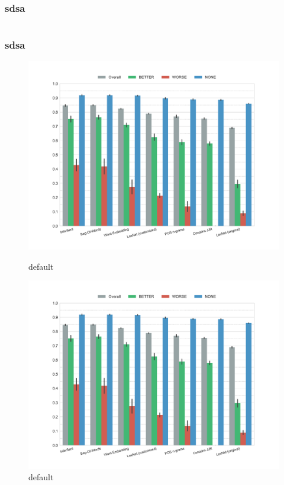\documentclass[11pt,aspectratio=169]{beamer}
\begin{document}
    \begin{frame}
        \frametitle{sdsa}
        \begin{columns}[t]
            \blindtext
            \blindtext
        \end{columns}
    \end{frame}
    \begin{frame}[fragile]
        \frametitle{sdsa}



        \begin{figure}[ht]
            \begin{minipage}[b]{0.47\linewidth}
                \centering
                \includegraphics[width=\textwidth]{images/f1-False}
                \caption{default}
            \end{minipage}
            \hspace{0.5cm}
            \begin{minipage}[b]{0.47\linewidth}
                \centering
                \includegraphics[width=\textwidth]{images/f1-False}
                \caption{default}
            \end{minipage}
        \end{figure}
    \end{frame}
\end{document}
